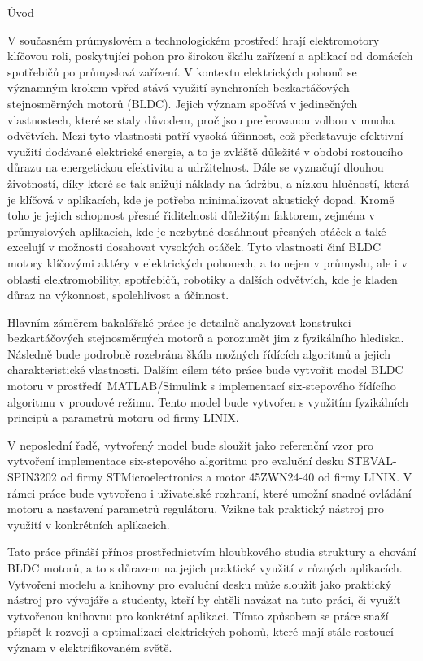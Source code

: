 
\chap Úvod


V současném průmyslovém a technologickém prostředí hrají elektromotory klíčovou roli, poskytující pohon pro širokou 
škálu zařízení a aplikací od domácích spotřebičů po průmyslová zařízení. V kontextu elektrických pohonů se významným krokem 
vpřed stává využití synchroních bezkartáčových stejnosměrných motorů (BLDC). Jejich význam spočívá 
v jedinečných vlastnostech, které se staly důvodem, proč jsou preferovanou volbou v mnoha odvětvích. 
Mezi tyto vlastnosti patří vysoká účinnost, což představuje efektivní využití dodávané elektrické energie, a to je zvláště 
důležité v období rostoucího důrazu na energetickou efektivitu a udržitelnost. Dále se vyznačují dlouhou životností, díky které se
 tak snižují náklady na údržbu, a nízkou hlučností, která je klíčová v aplikacích, kde je potřeba minimalizovat akustický dopad. 
Kromě toho je jejich schopnost přesné řiditelnosti důležitým faktorem, zejména v průmyslových aplikacích, kde je nezbytné 
dosáhnout přesných otáček a také excelují v možnosti dosahovat vysokých otáček. Tyto vlastnosti činí BLDC motory klíčovými aktéry v elektrických pohonech, a to 
nejen v průmyslu, ale i v oblasti elektromobility, spotřebičů, robotiky a dalších odvětvích, kde je kladen důraz na 
výkonnost, spolehlivost a účinnost.

Hlavním záměrem bakalářské práce je detailně analyzovat konstrukci bezkartáčových stejnosměrných motorů a porozumět 
jim z fyzikálního hlediska. Následně bude podrobně rozebrána škála možných řídících algoritmů a jejich charakteristické
vlastnosti. Dalším cílem této práce bude vytvořit model BLDC motoru v prostředí~\nobreak{}MATLAB/Simulink s implementací \nobreak{}six-stepového
řídícího algoritmu v proudové režimu. Tento model bude vytvořen s využitím fyzikálních principů a parametrů motoru od 
firmy LINIX.

V neposlední řadě, vytvořený model bude sloužit jako referenční vzor pro vytvoření implementace six-stepového algoritmu pro evaluční 
desku STEVAL-\nobreak{}SPIN3202 od firmy STMicroelectronics a motor 45ZWN24-40 od firmy LINIX. V rámci práce bude vytvořeno i uživatelské rozhraní, které 
umožní snadné ovládání motoru a nastavení parametrů regulátoru. Vzikne tak 
praktický nástroj pro využití v konkrétních aplikacich. 

Tato práce přináší přínos prostřednictvím hloubkového studia struktury a chování BLDC motorů, a to s důrazem na jejich praktické 
využití v různých aplikacích. Vytvoření modelu a knihovny pro evaluční desku může sloužit jako praktický nástroj pro vývojáře a studenty, kteří
by chtěli navázat na tuto práci, či využít vytvořenou knihovnu pro konkrétní aplikaci. Tímto způsobem se práce snaží přispět k rozvoji a optimalizaci elektrických 
pohonů, které mají stále rostoucí význam v elektrifikovaném světě.




